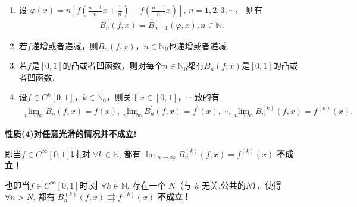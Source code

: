 \documentclass[../../main.tex]{subfiles}
\begin{document}
\begin{theorem}[Bernstein多项式的性质]\label{theorem:Bernstein多项式的性质}
\begin{enumerate}[(1)]
\item 设
\(\varphi(x)=n\left[f\left(\frac{n - 1}{n}x+\frac{1}{n}\right)-f\left(\frac{n - 1}{n}x\right)\right]\), \(n = 1,2,3,\cdots\)，
则有
\begin{align}\label{equation--Bernstein多项式性质13.115}
B_n^\prime(f,x)=B_{n - 1}(\varphi,x),n\in\mathbb{N}.
\end{align}

\item 若\(f\)递增或者递减，则\(B_n(f,x)\)，\(n\in\mathbb{N}_0\)也递增或者递减.

\item 若\(f\)是\([0,1]\)的凸或者凹函数，则对每个\(n\in\mathbb{N}_0\)都有\(B_n(f,x)\)是\([0,1]\)的凸或者凹函数.

\item 设\(f\in C^k[0,1]\)，\(k\in\mathbb{N}_0\)，则关于\(x\in[0,1]\)，一致的有
\begin{align}\label{equation--Bernstein多项式性质13.116}
\lim_{n\rightarrow\infty}B_n(f,x)=f(x),\lim_{n\rightarrow\infty}B_n^\prime(f,x)=f^\prime(x),\cdots,\lim_{n\rightarrow\infty}B_n^{(k)}(f,x)=f^{(k)}(x).
\end{align}
\end{enumerate} 
\end{theorem}
\begin{remark}
\textbf{性质(4)对任意光滑的情况并不成立!}

即当$f\in C^{\infty}[0,1]$时,对 $\forall k\in \mathbb{N}$, 都有 $\lim_{n\rightarrow \infty}B_{n}^{( k )}( f,x ) =f^{( k )}( x )$ \textbf{不成立！}

也即当$f\in C^{\infty}[0,1]$时,对 $\forall k\in \mathbb{N}$, 存在一个 $N$（与 $k$ 无关,公共的$N$），使得 $\forall n>N$, 都有 $B_{n}^{( k )}( f,x ) \rightrightarrows f^{( k )}( x )$ \textbf{不成立！}
\end{remark}
\end{document}
